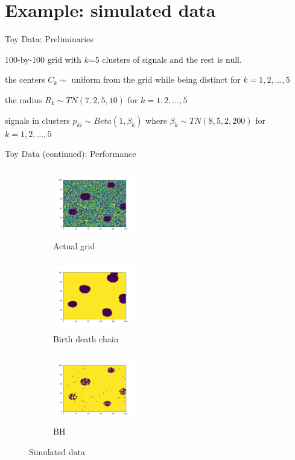 \documentclass[10pt,mathserif]{beamer}
\begin{document}
\section{Example: simulated data} 

\begin{frame} {Toy Data: Preliminaries}
\BIT
\item 100-by-100 grid with $k$=5 clusters of signals and the rest is null.
\item the centers $C_k \sim$  uniform from the grid while being distinct for $k = 1, 2, ..., 5$
\item the radius $R_k \sim T N (7, 2, 5, 10)$ for $k = 1, 2, ..., 5$
\item signals in clusters $p_{ki} \sim Beta(1, \beta_k)$ where $\beta_k \sim TN(8, 5, 2, 200)$ for $k = 1, 2, ..., 5$
\EIT
\end{frame}

\begin{frame} {Toy Data (continued): Performance }
\begin{figure}[t!]
    \centering
    \begin{subfigure}[t]{0.3\textwidth}
        \centering
        \includegraphics[height=1.2in, width=1.4in]{../sim_toydata2D_mu8/BDC_gridactual}
        \caption{Actual grid}
    \end{subfigure}%
    \begin{subfigure}[t]{0.3\textwidth}
        \centering
        \includegraphics[height=1.2in, width=1.4in]{../sim_toydata2D_mu8/BDC_grid1}
        \caption{Birth death chain}
    \end{subfigure}%
    \begin{subfigure}[t]{0.3\textwidth}
        \centering
        \includegraphics[height=1.2in, width=1.4in]{../sim_toydata2D_mu8/BH_toydata2D_disc}
        \caption{BH}
    \end{subfigure}
    \caption{Simulated data}
\end{figure}
\end{frame}
\end{document}
